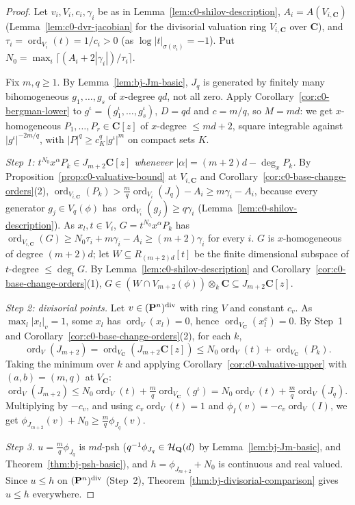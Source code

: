 \begin{proof}
Let $v_i,V_i,c_i,\gamma_i$ be as in Lemma~\ref{lem:c0-shilov-description}, $A_i=A(V_{i,\mathbf C})$ (Lemma~\ref{lem:c0-dvr-jacobian} for the divisorial
valuation ring $V_{i,\mathbf C}$ over $\mathbf C$), and $\tau_i=\operatorname{ord}_{V_i}(t)=1/c_i>0$ (as $\log|t|_{\sigma(v_i)}=-1$). Put
$N_0=\max_i\lceil(A_i+2|\gamma_i|)/\tau_i\rceil$.

Fix $m,q\ge1$. By Lemma~\ref{lem:bj-Jm-basic}, $J_q$ is generated by finitely many bihomogeneous $g_1,\dots,g_s$ of $x$-degree $qd$, not all zero.
Apply Corollary~\ref{cor:c0-bergman-lower} to $g^\iota=(g_1^\iota,\dots,g_s^\iota)$, $D=qd$ and $c=m/q$, so $M=md$: we get $x$-homogeneous
$P_1,\dots,P_r\in\mathbf C[z]$ of $x$-degree $\le md+2$, square integrable against $|g^\iota|^{-2m/q}$, with $|P|^q\ge c_K^q|g^\iota|^m$ on compact
sets $K$.

\emph{Step 1: $t^{N_0}x^\alpha P_k\in J_{m+2}\mathbf C[z]$ whenever $|\alpha|=(m+2)d-\deg_xP_k$.} By Proposition~\ref{prop:c0-valuative-bound} at $V_{i,\mathbf C}$ and
Corollary~\ref{cor:c0-base-change-orders}(2), $\operatorname{ord}_{V_{i,\mathbf C}}(P_k)>\frac mq\operatorname{ord}_{V_i}(J_q)-A_i\ge m\gamma_i-A_i$, because every generator
$g_j\in V_q(\phi)$ has $\operatorname{ord}_{V_i}(g_j)\ge q\gamma_i$ (Lemma~\ref{lem:c0-shilov-description}). As $x_l,t\in V_i$,
$G=t^{N_0}x^\alpha P_k$ has $\operatorname{ord}_{V_{i,\mathbf C}}(G)\ge N_0\tau_i+m\gamma_i-A_i\ge(m+2)\gamma_i$ for every $i$. $G$ is $x$-homogeneous of degree
$(m+2)d$; let $W\subseteq R_{(m+2)d}[t]$ be the finite dimensional subspace of $t$-degree $\le\deg_tG$. By Lemma~\ref{lem:c0-shilov-description} and
Corollary~\ref{cor:c0-base-change-orders}(1), $G\in(W\cap V_{m+2}(\phi))\otimes_k\mathbf C\subseteq J_{m+2}\mathbf C[z]$.

\emph{Step 2: divisorial points.} Let $v\in(\mathbf{P}^n)^{\mathrm{div}}$ with ring $V$ and constant $c_v$. As $\max_l|x_l|_v=1$, some $x_l$ has
$\operatorname{ord}_V(x_l)=0$, hence $\operatorname{ord}_{V_{\mathbf C}}(x_l^e)=0$. By Step~1 and Corollary~\ref{cor:c0-base-change-orders}(2), for each $k$,
\[
\operatorname{ord}_V(J_{m+2})=\operatorname{ord}_{V_{\mathbf C}}(J_{m+2}\mathbf C[z])\le N_0\operatorname{ord}_V(t)+\operatorname{ord}_{V_{\mathbf C}}(P_k).
\]
Taking the minimum over $k$ and applying Corollary~\ref{cor:c0-valuative-upper} with $(a,b)=(m,q)$ at $V_{\mathbf C}$:
$\operatorname{ord}_V(J_{m+2})\le N_0\operatorname{ord}_V(t)+\frac mq\operatorname{ord}_{V_{\mathbf C}}(g^\iota)=N_0\operatorname{ord}_V(t)+\frac mq\operatorname{ord}_V(J_q)$. Multiplying by $-c_v$, and using
$c_v\operatorname{ord}_V(t)=1$ and $\phi_I(v)=-c_v\operatorname{ord}_V(I)$, we get $\phi_{J_{m+2}}(v)+N_0\ge\frac mq\phi_{J_q}(v)$.

\emph{Step 3.} $u=\frac mq\phi_{J_q}$ is $md$-psh ($q^{-1}\phi_{J_q}\in\mathcal H_{\mathbf{Q}}(d)$ by Lemma~\ref{lem:bj-Jm-basic}, and Theorem~\ref{thm:bj-psh-basic}), and
$h=\phi_{J_{m+2}}+N_0$ is continuous and real valued. Since $u\le h$ on $(\mathbf{P}^n)^{\mathrm{div}}$ (Step~2), Theorem~\ref{thm:bj-divisorial-comparison} gives
$u\le h$ everywhere.
\end{proof}

